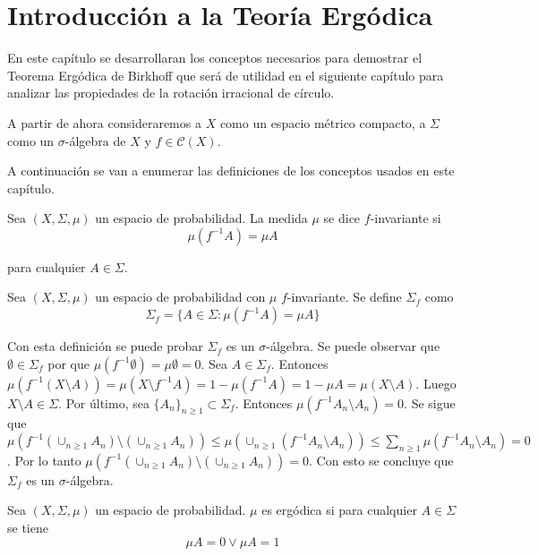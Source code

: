 \chapter{Introducción a la Teoría Ergódica}

En este capítulo se desarrollaran los conceptos necesarios para  demostrar el Teorema Ergódica de Birkhoff que será de utilidad en el siguiente capítulo para analizar las propiedades de la rotación irracional de círculo.

A partir de ahora consideraremos a $X$ como un espacio métrico compacto, a $\Sigma$ como un $\sigma$-álgebra de $X$ y $f \in \mathcal{C}(X)$.

A continuación se van a enumerar las definiciones de los conceptos usados en este capítulo.

\begin{definicion}
	Sea $(X,\Sigma,\mu)$ un espacio de probabilidad. La medida $\mu$ se dice $f$-invariante si	
	\begin{equation}
		\mu(f^{-1}A) = \mu A
	\end{equation}
	
	para cualquier $A \in \Sigma$.
\end{definicion}

\begin{definicion}
	Sea $(X,\Sigma,\mu)$ un espacio de probabilidad  con $\mu$ $f$-invariante. Se define $\Sigma_f$ como	
	\begin{equation}
		\Sigma_f = \{ A \in \Sigma: \mu(f^{-1}A) = \mu A \}
	\end{equation}
\end{definicion}

Con esta definición se puede probar $\Sigma_f$ es un $\sigma$-álgebra. Se puede observar que $\emptyset \in \Sigma_f$ por que $\mu(f^{-1} \emptyset) = \mu \emptyset = 0$. Sea $A \in \Sigma_f$. Entonces $\mu(f^{-1}(X \setminus A)) =  \mu(X \setminus f^{-1}A) = 1 - \mu(f^{-1}A) = 1 - \mu A = \mu(X \setminus A)$. Luego $X \setminus A \in \Sigma$. Por último, sea $\{A_n\}_{n \geq 1} \subset \Sigma_f$. Entonces $\mu(f^{-1}A_n \setminus A_n) = 0$. Se sigue que $\mu(f^{-1}(\cup_{n \geq 1} A_n) \setminus (\cup_{n \geq 1} A_n)) \leq \mu(\cup_{n \geq 1} (f^{-1}A_n \setminus A_n)) \leq \sum_{n \geq 1} \mu(f^{-1}A_n \setminus A_n) = 0$. Por lo tanto $\mu(f^{-1}(\cup_{n \geq 1} A_n) \setminus (\cup_{n \geq 1} A_n)) = 0$. Con esto se concluye que $\Sigma_f$ es un $\sigma$-álgebra. 

\begin{definicion}
	Sea $(X,\Sigma,\mu)$ un espacio de probabilidad. $\mu$ es ergódica si para cualquier $A \in \Sigma$ se tiene	
	\begin{equation}
		\mu A = 0 \vee \mu A = 1
	\end{equation}
\end{definicion}


